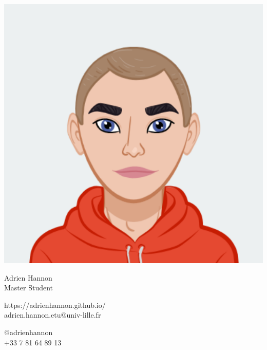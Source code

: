 \documentclass{article}
\begin{document}
\centering \includegraphics[width=.2\linewidth]{logo}\\[5pt]
\parbox{2in}{\Large \centering Adrien Hannon\\[1pt]
\normalsize Master Student}

\vfill
\raggedright
\begin{multicols}{2}
https://adrienhannon.github.io/\\
adrien.hannon.etu@univ-lille.fr

\columnbreak
\raggedleft
@adrienhannon\\
+33 7 81 64 89 13%
\end{multicols}%
\end{document}
